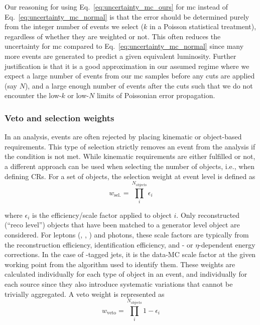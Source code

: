 Our reasoning for using Eq.~\ref{eq:uncertainty_mc_ours} for \acrshort{mc} instead of Eq.~\ref{eq:uncertainty_mc_normal} is that the error should be determined purely from the integer number of events we select ($k$ in a Poisson statistical treatment), regardless of whether they are weighted or not. This often reduces the uncertainty for \acrshort{mc} compared to Eq.~\ref{eq:uncertainty_mc_normal} since many more events are generated to predict a given equivalent luminosity. Further justification is that it is a good approximation in our assumed regime where we expect a large number of events from our \acrshort{mc} samples before any cuts are applied (say $N$), and a large enough number of events after the cuts such that we do not encounter the low-$k$ or low-$N$ limits of Poissonian error propagation.





\subsubsection{Veto and selection weights}
\label{subsubsec:veto_sel_weights}

In an analysis, events are often rejected by placing kinematic or object-based requirements. This type of selection strictly removes an event from the analysis if the condition is not met. While kinematic requirements are either fulfilled or not, a different approach can be used when selecting the number of objects, i.e., when defining \glspl{CR}. For a set of objects, the selection weight at event level is defined as
\begin{equation}
    w_{\mathrm{sel.}} = \prod_i^{N_\mathrm{objects}} \epsilon_i
    \label{eq:event_selection_weight}
\end{equation}

where $\epsilon_i$ is the efficiency/scale factor applied to object $i$. Only reconstructed (``reco level'') objects that have been matched to a generator level object are considered. For leptons (\Pe, \Pmu, \Ptau) and photons, these scale factors are typically from the reconstruction efficiency, identification efficiency, and \pt- or $\eta$-dependent energy corrections. In the case of \Pbottom-tagged \glspl{jet}, it is the data-MC scale factor at the given working point from the algorithm used to identify them. These weights are calculated individually for each type of object in an event, and individually for each source since they also introduce systematic variations that cannot be trivially aggregated. A veto weight is represented as
\begin{equation}
    w_{\mathrm{veto}} = \prod_i^{N_\mathrm{objects}} 1 - \epsilon_i
    \label{eq:event_veto_weight}
\end{equation}

